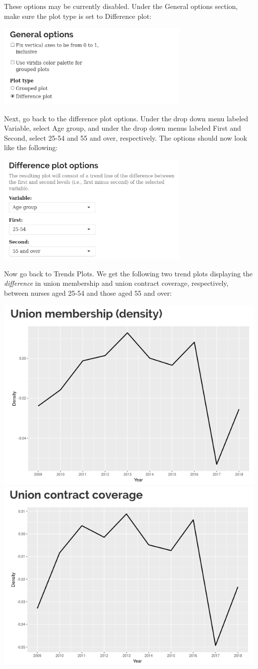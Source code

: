 \documentclass[letterpaper,12pt]{article}
\begin{document}
\begin{enumerate}
\begin{center}
  \end{center}
  These options may be currently disabled. Under the General options
  section, make sure the plot type is set to Difference plot:
  \begin{center}
    \includegraphics[width=0.7\textwidth]{images/trends_ex2/options_plot_type.png}
  \end{center}
  Next, go back to the difference plot options. Under the drop down
  menu labeled Variable, select Age group, and under the drop down
  menus labeled First and Second, select 25-54 and 55 and over,
  respectively. The options should now look like the following:
  \begin{center}
    \includegraphics[width=0.7\textwidth]{images/trends_ex2/options_diff_plots2.png}
  \end{center}
  Now go back to Trends \textrightarrow{} Plots. We get the following
  two trend plots displaying the \emph{difference} in union membership
  and union contract coverage, respectively, between nurses aged 25-54
  and those aged 55 and over:
  \begin{center}
    \includegraphics[width=0.49\linewidth]{images/trends_ex2/membership_trend.png}
    \includegraphics[width=0.49\linewidth]{images/trends_ex2/coverage_trend.png}
  \end{center}


\end{enumerate}
\end{document}
